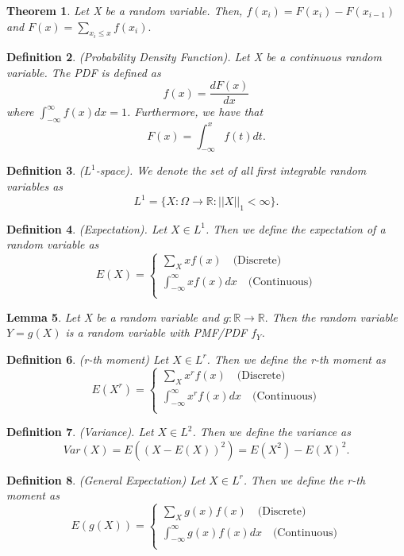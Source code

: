 \documentclass[twoside]{article}
\newcounter{lecnum}
\newtheorem{theorem}{Theorem}[lecnum]
\newtheorem{lemma}[theorem]{Lemma}
\newtheorem{definition}[theorem]{Definition}
\begin{document}
\begin{theorem}Let X be a random variable. Then, $f(x_i) = F(x_{i}) - F(x_{i-1})$ and $F(x) = \sum_{x_{i} \leq x}f(x_i).$
\end{theorem}

\begin{definition}(Probability Density Function). Let X be a continuous random variable. The PDF is defined as 
$$
f(x) = \frac{dF(x)}{dx}
$$
where $\int_{-\infty}^{\infty}f(x)dx=1$. Furthermore, we have that 
$$
F(x) = \int_{-\infty}^{x}f(t)dt.
$$
\end{definition}

\begin{definition}($L^1$-space). We denote the set of all first integrable random variables as
$$
L^1 = \{X: \Omega \rightarrow \mathbb{R}: ||X||_1 < \infty \}.
$$
\end{definition}

\begin{definition}(Expectation). Let $X \in L^1$. Then we define the expectation of a random variable as 
$$
E(X) = \begin{cases}
\sum_{X}xf(x) \quad \text{(Discrete)}\\
\int_{-\infty}^{\infty}xf(x)dx \quad \text{(Continuous)}\\
\end{cases}
$$
\end{definition}

\begin{lemma}Let X be a random variable and $g: \mathbb{R} \rightarrow \mathbb{R}.$ Then the random variable $Y = g(X)$ is a random variable with PMF/PDF $f_Y$.
\end{lemma}

\begin{definition}(r-th moment) Let $X \in L^r$. Then we define the r-th moment as
$$
E(X^r) = \begin{cases}
\sum_{X}x^rf(x) \quad \text{(Discrete)}\\
\int_{-\infty}^{\infty}x^rf(x)dx \quad \text{(Continuous)}\\
\end{cases}
$$
\end{definition}

\begin{definition}(Variance). Let $X \in L^2$. Then we define the variance as
$$
Var(X) = E((X - E(X))^2) = E(X^2) - E(X)^2.
$$
\end{definition}

\begin{definition}(General Expectation) Let $X \in L^r$. Then we define the r-th moment as
$$
E(g(X)) = \begin{cases}
\sum_{X}g(x)f(x) \quad \text{(Discrete)}\\
\int_{-\infty}^{\infty}g(x)f(x)dx \quad \text{(Continuous)}\\
\end{cases}
$$
\end{definition}
\end{document}

